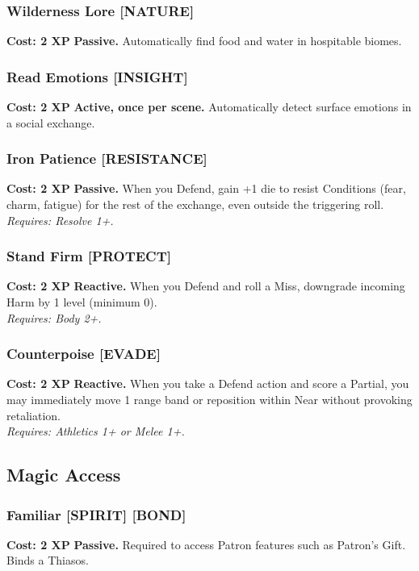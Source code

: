 \subsubsection*{Wilderness Lore \textnormal{[NATURE]}}
\label{talent:wilderness-lore}
\textbf{Cost: 2 XP} \textbf{Passive.} Automatically find food and water in hospitable biomes.

\subsubsection*{Read Emotions \textnormal{[INSIGHT]}}
\label{talent:read-emotions}
\textbf{Cost: 2 XP} \textbf{Active, once per scene.} Automatically detect surface emotions in a social exchange.

\subsubsection*{Iron Patience \textnormal{[RESISTANCE]}}
\label{talent:iron-patience}
\textbf{Cost: 2 XP} \textbf{Passive.} When you Defend, gain +1 die to resist Conditions (fear, charm, fatigue) for the rest of the exchange, even outside the triggering roll. \\
\textit{Requires: Resolve 1+.}

\subsubsection*{Stand Firm \textnormal{[PROTECT]}}
\label{talent:stand-firm}
\textbf{Cost: 2 XP} \textbf{Reactive.} When you Defend and roll a Miss, downgrade incoming Harm by 1 level (minimum 0). \\
\textit{Requires: Body 2+.}

\subsubsection*{Counterpoise \textnormal{[EVADE]}}
\label{talent:counterpoise}
\textbf{Cost: 2 XP} \textbf{Reactive.} When you take a Defend action and score a Partial, you may immediately move 1 range band or reposition within Near without provoking retaliation. \\
\textit{Requires: Athletics 1+ or Melee 1+.}

\subsection*{Magic Access}
\label{sec:minor-magic-access}

\subsubsection*{Familiar \textnormal{[SPIRIT] [BOND]}}
\label{talent:familiar}
\textbf{Cost: 2 XP} \textbf{Passive.} Required to access Patron features such as Patron's Gift. Binds a Thiasos.

